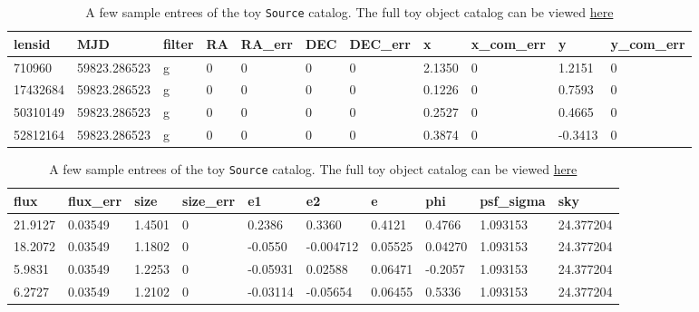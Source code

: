 \documentclass[\docopts]{\docclass}
\def\Source{\texttt{Source}\xspace}
\begin{document}
\begin{table}[!h]
\centering
\begin{tabular}{|l|l|l|l|l|l|l|l|l|l|l|}
\hline
lensid   & MJD          & filter & RA & RA\_err & DEC & DEC\_err & x              & x\_com\_err & y               & y\_com\_err \\ \hline
710960   & 59823.286523 & g      & 0  & 0       & 0   & 0        & 2.1350  & 0           & 1.2151 & 0			\\
17432684 & 59823.286523 & g      & 0  & 0       & 0   & 0        & 0.1226 & 0           & 0.7593  & 0           \\
50310149 & 59823.286523 & g      & 0  & 0       & 0   & 0        & 0.2527 & 0           & 0.4665  & 0           \\
52812164 & 59823.286523 & g      & 0  & 0       & 0   & 0        & 0.3874 & 0           & -0.3413 & 0          \\ \hline
\end{tabular}
\begin{tabular}{|l|l|l|l|l|l|l|l|l|l|}
\hline
flux          & flux\_err       & size          & size\_err & e1               & e2                & e               & phi             & psf\_sigma & sky       \\ \hline
21.9127 & 0.03549 & 1.4501 & 0         & 0.2386    & 0.3360    & 0.4121  & 0.4766  & 1.093153   & 24.377204 \\
18.2072 & 0.03549& 1.1802  & 0         & -0.0550 & -0.004712  & 0.05525 & 0.04270 & 1.093153   & 24.377204 \\
5.9831 & 0.03549 & 1.2253 & 0         & -0.05931 & 0.02588     & 0.06471 & -0.2057 & 1.093153   & 24.377204 \\
6.2727 & 0.03549 & 1.2102  & 0         & -0.03114 & -0.05654  & 0.06455 & 0.5336  & 1.093153   & 24.377204 \\ \hline
\end{tabular}
\caption{A few sample entrees of the toy \Source catalog. The full toy object catalog can be viewed \href{https://www.dropbox.com/s/muqui8eu3kxox2l/toy_source_catalog.csv?dl=0}{here}}
\label{tab:source}
\end{table}
\end{document}
